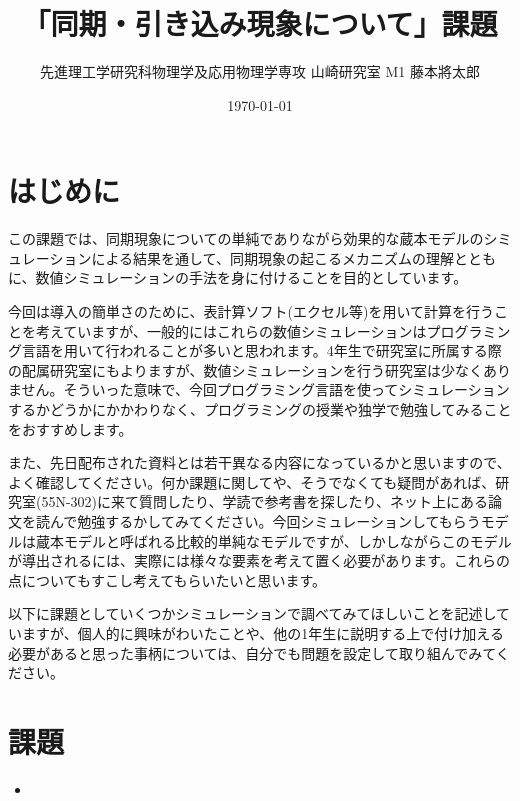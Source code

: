 \documentclass{jsarticle}
\title{「同期・引き込み現象について」課題}
\author{先進理工学研究科物理学及応用物理学専攻 山崎研究室 M1 藤本將太郎}
\date{\today}
\begin{document}
\maketitle

\section{はじめに}
この課題では、同期現象についての単純でありながら効果的な蔵本モデルのシミュレーションによる結果を通して、同期現象の起こるメカニズムの理解とともに、数値シミュレーションの手法を身に付けることを目的としています。

今回は導入の簡単さのために、表計算ソフト(エクセル等)を用いて計算を行うことを考えていますが、一般的にはこれらの数値シミュレーションはプログラミング言語を用いて行われることが多いと思われます。4年生で研究室に所属する際の配属研究室にもよりますが、数値シミュレーションを行う研究室は少なくありません。そういった意味で、今回プログラミング言語を使ってシミュレーションするかどうかにかかわりなく、プログラミングの授業や独学で勉強してみることをおすすめします。

また、先日配布された資料とは若干異なる内容になっているかと思いますので、よく確認してください。何か課題に関してや、そうでなくても疑問があれば、研究室(55N-302)に来て質問したり、学読で参考書を探したり、ネット上にある論文を読んで勉強するかしてみてください。今回シミュレーションしてもらうモデルは蔵本モデルと呼ばれる比較的単純なモデルですが、しかしながらこのモデルが導出されるには、実際には様々な要素を考えて置く必要があります。これらの点についてもすこし考えてもらいたいと思います。

以下に課題としていくつかシミュレーションで調べてみてほしいことを記述していますが、個人的に興味がわいたことや、他の1年生に説明する上で付け加える必要があると思った事柄については、自分でも問題を設定して取り組んでみてください。

\section{課題}
\begin{itemize}
    \item 
\end{itemize}
\end{document}
